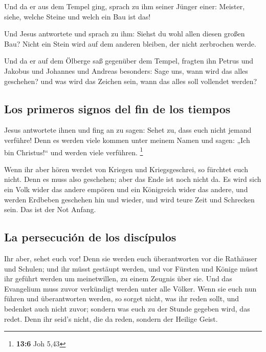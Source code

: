  Und da er aus dem Tempel ging, sprach zu ihm seiner
Jünger einer: Meister, siehe, welche Steine und welch ein Bau ist das!

 Und Jesus antwortete und sprach zu ihm: Siehst du wohl
allen diesen großen Bau? Nicht ein Stein wird auf dem anderen bleiben,
der nicht zerbrochen werde.

 Und da er auf dem Ölberge saß gegenüber dem Tempel,
fragten ihn Petrus und Jakobus und Johannes und Andreas besonders:
 Sage uns, wann wird das alles geschehen? und was wird das
Zeichen sein, wann das alles soll vollendet werden?

\hypertarget{los-primeros-signos-del-fin-de-los-tiempos-1}{%
\subsection{Los primeros signos del fin de los
tiempos}\label{los-primeros-signos-del-fin-de-los-tiempos-1}}

 Jesus antwortete ihnen und fing an zu sagen: Sehet zu,
dass euch nicht jemand verführe!  Denn es werden viele
kommen unter meinem Namen und sagen: „Ich bin Christus!{}`` und werden
viele verführen. \footnote{\textbf{13:6} Joh 5,43}

 Wenn ihr aber hören werdet von Kriegen und
Kriegsgeschrei, so fürchtet euch nicht. Denn es muss also geschehen;
aber das Ende ist noch nicht da.  Es wird sich ein Volk
wider das andere empören und ein Königreich wider das andere, und werden
Erdbeben geschehen hin und wieder, und wird teure Zeit und Schrecken
sein. Das ist der Not Anfang.

\hypertarget{la-persecuciuxf3n-de-los-discuxedpulos}{%
\subsection{La persecución de los
discípulos}\label{la-persecuciuxf3n-de-los-discuxedpulos}}

 Ihr aber, sehet euch vor! Denn sie werden euch
überantworten vor die Rathäuser und Schulen; und ihr müsst gestäupt
werden, und vor Fürsten und Könige müsst ihr geführt werden um
meinetwillen, zu einem Zeugnis über sie.  Und das
Evangelium muss zuvor verkündigt werden unter alle Völker.
 Wenn sie euch nun führen und überantworten werden, so
sorget nicht, was ihr reden sollt, und bedenket auch nicht zuvor;
sondern was euch zu der Stunde gegeben wird, das redet. Denn ihr seid's
nicht, die da reden, sondern der Heilige Geist.

